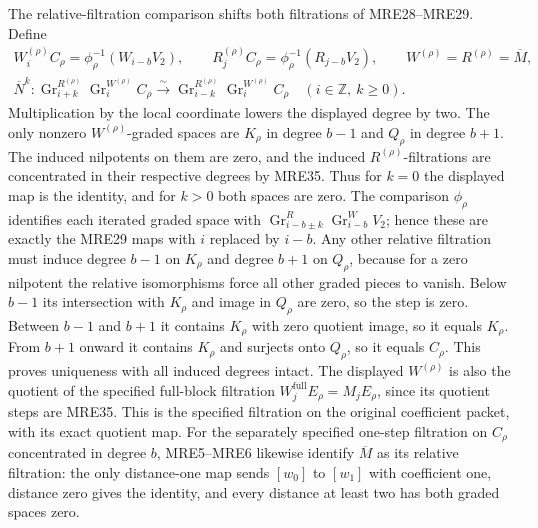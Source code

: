 The relative-filtration comparison shifts both filtrations of
MRE28--MRE29. Define
\[
 \begin{gathered}
 W_i^{(\rho)}C_\rho=\phi_\rho^{-1}(W_{i-b}V_2),\qquad
 R_j^{(\rho)}C_\rho=\phi_\rho^{-1}(R_{j-b}V_2),\qquad
 W^{(\rho)}=R^{(\rho)}=\overline M,\\
 \overline N^k:
 \operatorname{Gr}_{i+k}^{R^{(\rho)}}
                       \operatorname{Gr}_i^{W^{(\rho)}}C_\rho
 \xrightarrow{\sim}
 \operatorname{Gr}_{i-k}^{R^{(\rho)}}
                       \operatorname{Gr}_i^{W^{(\rho)}}C_\rho
                       \quad(i\in\mathbb Z,\ k\geq0).
 \end{gathered}
 \tag{MRE40}
\]
Multiplication by the local coordinate lowers the displayed degree
by two. The only nonzero \(W^{(\rho)}\)-graded spaces are
\(K_\rho\) in degree \(b-1\) and \(Q_\rho\) in degree \(b+1\).
The induced nilpotents on them are zero, and the induced
\(R^{(\rho)}\)-filtrations are concentrated in their respective
degrees by MRE35. Thus for \(k=0\) the displayed map is the
identity, and for \(k>0\) both spaces are zero. The comparison
\(\phi_\rho\) identifies each iterated graded space with
\(\operatorname{Gr}_{i-b\pm k}^{R}
\operatorname{Gr}_{i-b}^{W}V_2\); hence these are exactly the
MRE29 maps with \(i\) replaced by \(i-b\).
Any other relative filtration must induce degree \(b-1\) on
\(K_\rho\) and degree \(b+1\) on \(Q_\rho\), because for a zero
nilpotent the relative isomorphisms force all other graded pieces
to vanish. Below \(b-1\) its intersection with \(K_\rho\) and
image in \(Q_\rho\) are zero, so the step is zero. Between
\(b-1\) and \(b+1\) it contains \(K_\rho\) with zero quotient
image, so it equals \(K_\rho\). From \(b+1\) onward it contains
\(K_\rho\) and surjects onto \(Q_\rho\), so it equals
\(C_\rho\). This proves uniqueness with all induced degrees intact.
The displayed \(W^{(\rho)}\) is also the quotient of the specified
full-block filtration \(W_j^{\mathrm{full}}E_\rho=M_jE_\rho\),
since its quotient steps are MRE35. This is the specified filtration
on the original coefficient packet, with its exact quotient map.
For the separately specified one-step
filtration on \(C_\rho\) concentrated in degree \(b\), MRE5--MRE6
likewise identify \(\overline M\) as its relative filtration:
the only distance-one map sends \([w_0]\) to \([w_1]\) with
coefficient one, distance zero gives the identity, and every
distance at least two has both graded spaces zero.

